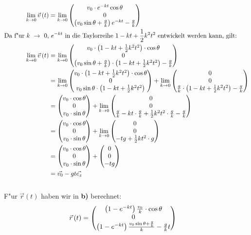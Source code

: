 \documentclass{theozettel}
\begin{document}
\begin{align*}
\lim_{k\rightarrow 0}\vec{v}\left(t\right)&=\lim_{k\rightarrow 0}\mqty(v_0\cdot e^{-kt}\cos\theta\\0\\\left(v_0\sin\theta+\frac{g}{k}\right)e^{-kt}-\frac{g}{k})\\
\text{Da f"ur} \ k \ \rightarrow \ 0\text{,} &\  e^{-kt} \ \text{in die Taylorreihe} \ 1-kt+\frac{1}{2}k^2t^2 \ \text{entwickelt werden kann, gilt:} \\
\lim_{k\rightarrow 0}\vec{v}\left(t\right)&=\lim_{k\rightarrow 0}\mqty(v_0\cdot \left(1-kt+\frac{1}{2}k^2t^2\right)\cdot\cos\theta\\0\\\left(v_0\sin\theta+\frac{g}{k}\right)\cdot\left(1-kt+\frac{1}{2}k^2t^2\right)-\frac{g}{k})\\
&=\lim_{k\rightarrow 0}\mqty(v_0\cdot \left(1-kt+\frac{1}{2}k^2t^2\right)\cdot\cos\theta\\0\\v_0\sin\theta\cdot\left(1-kt+\frac{1}{2}k^2t^2\right) )+\lim_{k\rightarrow 0}\mqty(0\\0\\\frac{g}{k}\cdot\left(1-kt+\frac{1}{2}k^2t^2\right)-\frac{g}{k})\\
&=\mqty(v_0\cdot\cos\theta\\0\\v_0\cdot\sin\theta)+\lim_{k\rightarrow 0}\mqty(0\\0\\\frac{g}{k}-kt\cdot\frac{g}{k}+\frac{1}{2}k^2t^2\cdot\frac{g}{k}-\frac{g}{k})\\
&=\mqty(v_0\cdot\cos\theta\\0\\v_0\cdot\sin\theta)+\lim_{k\rightarrow 0}\mqty(0\\0\\-tg+\frac{1}{2}kt^2\cdot g)\\
&=\mqty(v_0\cdot\cos\theta\\0\\v_0\cdot\sin\theta)+\mqty(0\\0\\-tg)\\
&=\vec{v_0}-gt\vec{e_z}
\end{align*}\\
\newpage
F"ur $\vec{r}\left(t\right)$ haben wir in \textbf{b)} berechnet:
\begin{align*}
\vec{r}\left(t\right)&=\mqty(\left(1-e^{-kt}\right)\frac{v_0}{k}\cdot \cos\theta\\0\\\left(1-e^{-kt}\right)\frac{v_0\sin\theta +\frac{g}{k}}{k}-\frac{g}{k}t)
\end{align*}
\end{document}
